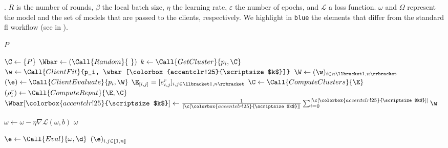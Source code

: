 \begin{algorithm}
  \caption{
    \thecontrib.
    $R$ is the number of rounds, $\beta$ the local batch size, $\eta$ the learning rate, $\varepsilon$ the number of epochs, and $\mathcal{L}$ a loss function.
    $\omega$ and $\Omega$ represent the model and the set of models that are passed to the clients, respectively.
    We highlight in \colorbox{accentclr!25}{\texttt{blue}} the elements that differ from the standard \gls{fl} workflow (see  in ).
    \label{alg:xeval}
  }
  \setlength{\fboxsep}{1pt}
  \newcommand{\hl}[1]{\colorbox{accentclr!25}{\scriptsize $#1$}}
  \begin{small}
    \begin{algorithmic}[1]
      \Require $P$
  
\BeginBox[fill=accentclr!25]
        \State $ \C \gets \{ P \}$
\EndBox
        \State $ \Wbar \gets (\Call{Random}{\ })$
      \EndWith
      \Statex
\BeginBox[fill=accentclr!25]
          \State $k \gets \Call{GetCluster}{p_i, \C}$
\EndBox
          \State $\w \gets \Call{ClientFit}{p_i, \wbar[\hl{k}]}$
        \EndFor
        \Statex
\BeginBox[fill=accentclr!25]
        \State $ \W \gets (\w)_{i \in n \llbracket 1,n \rrbracket} $ 
\EndBox
        \Statex
\BeginBox[fill=accentclr!25]
          \State $(\e) \gets \Call{ClientEvaluate}{p_i, \W}$
        \EndFor
        \State $ \E_{[i,j]} = [e_{i,j}^r]_{i,j \in \llbracket 1,n \rrbracket} $
\EndBox
        \Statex
\BeginBox[fill=accentclr!25]
        \State $ \C \gets \Call{ComputeClusters}{\E}$              
        \ForAll{$  \c \in \C $}
          \State $ (\rho_i^r) \gets \Call{ComputeReput}{\E, \C}$   
\EndBox
          \State $ \Wbar[\hl{k}] \gets \frac{1}{|\c[\hl{k}]|} \sum_{i=0}^{|\c[\hl{k}]|} \w$
        \EndFor
      \EndFor
  
      \Statex %
            \State $ \omega \gets \omega - \eta \nabla \mathcal{L}(\omega,b) $
          \EndFor
        \EndFor
        \Statex
        \State \Return $\omega$
      \EndFunction
  
      \Statex %
\BeginBox[fill=accentclr!25]
       
          \State $ \e \gets \Call{Eval}{\omega, \d}$
        \EndFor
        \State \Return $(\e)_{i,j \in [\![ 1,n ]\!]}$
      \EndFunction
\EndBox
    \end{algorithmic}
  \end{small}
\end{algorithm}

